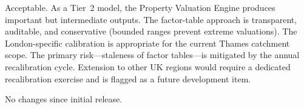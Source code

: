 \documentclass[11pt,a4paper]{article}
\begin{document}
Acceptable. As a Tier~2 model, the Property Valuation Engine produces important but intermediate outputs. The factor-table approach is transparent, auditable, and conservative (bounded ranges prevent extreme valuations). The London-specific calibration is appropriate for the current Thames catchment scope. The primary risk---staleness of factor tables---is mitigated by the annual recalibration cycle. Extension to other UK regions would require a dedicated recalibration exercise and is flagged as a future development item.

\clearpage

\mkmchangelog

\noindent No changes since initial release.


\end{document}
